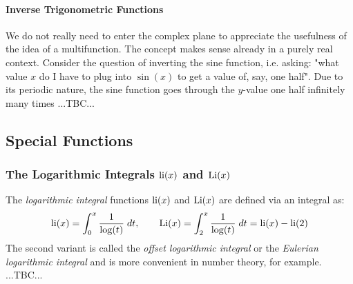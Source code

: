 \paragraph{Inverse Trigonometric Functions} 
We do not really need to enter the complex plane to appreciate the usefulness of the idea of a multifunction. The concept makes sense already in a purely real context. Consider the question of inverting the sine function, i.e. asking: "what value $x$ do I have to plug into $\sin(x)$ to get a value of, say, one half". Due to its periodic nature, the sine function goes through the $y$-value one half infinitely many times ...TBC...








\subsection{Special Functions}


\subsubsection{The Logarithmic Integrals $\operatorname{li}(x)$ and $\operatorname{Li}(x)$}
The \emph{logarithmic integral} functions $\operatorname{li}(x)$ and $\operatorname{Li}(x)$ are defined via an integral as:
\begin{equation}
\label{Eq:LogarithmicIntegral}
 \operatorname{li}(x) = \int_{0}^{x} \frac{1}{\log(t)} \; dt, \qquad
 \operatorname{Li}(x) = \int_{2}^{x} \frac{1}{\log(t)} \; dt
        = \operatorname{li}(x) - \operatorname{li}(2)
\end{equation}
The second variant is called the \emph{offset logarithmic integral} or the \emph{Eulerian logarithmic integral} and is more convenient in number theory, for example. ...TBC...


